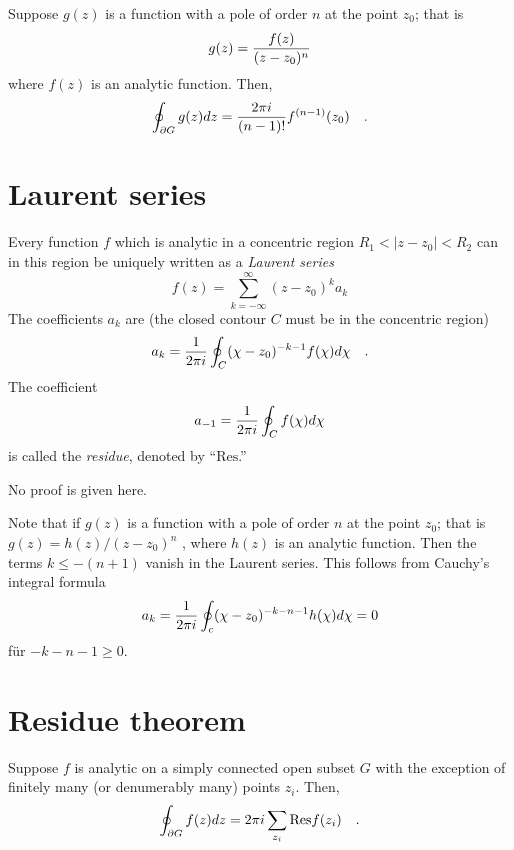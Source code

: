 Suppose $g(z)$ is a function with a pole of order $n$ at the point
 $z_0$; that is
 \begin{equation}
g(z)= {f(z)\over (z-z_0)^n}
\end{equation}
 where $f(z)$ is an analytic function. Then,
 \begin{equation}
\oint_{\partial G}g(z)dz={2\pi i\over (n-1)!}f^{(n-1)}(z_0)\quad .
\end{equation}



 \section{Laurent series}

Every function $f$ which is analytic in a concentric region
$R_1< \vert z-z_0\vert <R_2$ can in this region be uniquely written as a {\em Laurent series}
 \begin{equation}
f(z)=\sum_{k=-\infty}^\infty (z-z_0)^k a_k
\label{011-m-ch-ca-else1}
\end{equation}
The coefficients $a_k$ are
 (the closed contour $C$ must be in the concentric region)
 \begin{equation}
a_k={1\over 2\pi i}\oint_C (\chi -z_0)^{-k-1}f(\chi ) d\chi \quad.
\end{equation}
The coefficient
\begin{equation}
a_{-1}={1\over 2\pi i}\oint_C f(\chi )d\chi
\label{011-m-ch-ca-else2}
\end{equation}
is called the
{\em residue}, denoted by
 ``$\textrm{Res}$.''

No proof is given here.

Note that if  $g(z)$ is a function with a pole of order $n$ at the point
 $z_0$; that is
 $g(z)= {h(z)/ (z-z_0)^n}$ ,
where $h(z)$ is an analytic function. Then the terms  $k\le -(n+1)$
vanish in the Laurent series.
This follows from  Cauchy's integral formula
\begin{equation}
a_k ={1\over 2\pi i}\oint_c(\chi -z_0)^{-k-n-1}h(\chi )d\chi =0
\end{equation}
 f\"ur $-k-n-1\ge 0$.


 \section{Residue theorem}


Suppose $f$ is analytic on a  simply connected open subset $G$
with the exception of finitely many (or denumerably many) points  $z_i$.
Then,
\begin{equation}
\oint_{\partial G} f(z)dz=2\pi i \sum_{z_i} {\rm Res}f(z_i)\quad .
\end{equation}


